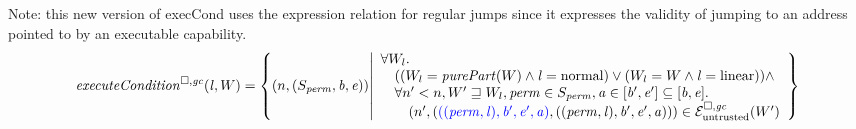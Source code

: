 \documentclass[a4paper]{article}
\begin{document}

Note: this new version of execCond uses the expression relation for regular jumps since it expresses the validity of jumping to an address pointed to by an executable capability. 
\[
  \execCond{\lin,W} = \left\{ \npair{(S_\perm,\baddr,\eaddr)} \middle|
    \begin{array}{l}
      \forall W_l \ldotp\\
      \quad ((W_l = \purePart{W} \wedge \lin = \normal) \vee (W_l = W \wedge \lin = \linear)) \wedge\\
      \quad \forall n' < n, W' \future W_l, \perm \in S_\perm, \aaddr \in [\baddr',\eaddr'] \subseteq [\baddr,\eaddr] \ldotp\\
      \qquad \npair[n']{\stpair[.]{((\perm,\lin),\baddr',\eaddr',\aaddr)}{((\perm,\lin),\baddr',\eaddr',\aaddr)}} \in \lre(W')
    \end{array}
    \right\}
\]
\end{document}
